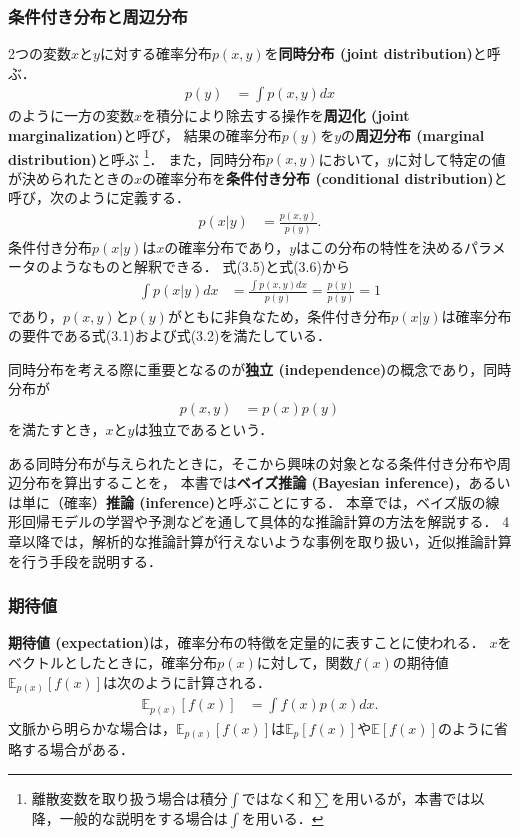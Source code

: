 \documentclass[11pt,a4paper]{jsarticle}
\numberwithin{equation}{section}
\begin{document}
\subsubsection{条件付き分布と周辺分布}
2つの変数$x$と$y$に対する確率分布$p(x, y)$を\textbf{同時分布 (joint distribution)}と呼ぶ．
\begin{align}
p(y)
& =
\int p(x, y) dx
\end{align}
のように一方の変数$x$を積分により除去する操作を\textbf{周辺化 (joint marginalization)}と呼び，
結果の確率分布$p(y)$を$y$の\textbf{周辺分布 (marginal distribution)}と呼ぶ
\footnote{
離散変数を取り扱う場合は積分$\int$ではなく和$\sum$を用いるが，本書では以降，一般的な説明をする場合は$\int$を用いる．
}．
また，同時分布$p(x, y)$において，$y$に対して特定の値が決められたときの$x$の確率分布を\textbf{条件付き分布 (conditional distribution)}と呼び，次のように定義する．
\begin{align}
p(x | y)
& =
\frac{p(x, y)}{p(y)}.
\end{align}
条件付き分布$p(x | y)$は$x$の確率分布であり，$y$はこの分布の特性を決めるパラメータのようなものと解釈できる．
式(3.5)と式(3.6)から
\begin{align}
\int p(x | y) dx
& =
\frac{\int p(x, y) dx}{p(y)}
= \frac{p(y)}{p(y)}
= 1
\end{align}
であり，$p(x, y)$と$p(y)$がともに非負なため，条件付き分布$p(x | y)$は確率分布の要件である式(3.1)および式(3.2)を満たしている．

同時分布を考える際に重要となるのが\textbf{独立 (independence)}の概念であり，同時分布が
\begin{align}
p(x, y)
& =
p(x) p(y)
\end{align}
を満たすとき，$x$と$y$は独立であるという．

ある同時分布が与えられたときに，そこから興味の対象となる条件付き分布や周辺分布を算出することを，
本書では\textbf{ベイズ推論 (Bayesian inference)}，あるいは単に（確率）\textbf{推論 (inference)}と呼ぶことにする．
本章では，ベイズ版の線形回帰モデルの学習や予測などを通して具体的な推論計算の方法を解説する．
4章以降では，解析的な推論計算が行えないような事例を取り扱い，近似推論計算を行う手段を説明する．

\subsubsection{期待値}
\textbf{期待値 (expectation)}は，確率分布の特徴を定量的に表すことに使われる．
$x$をベクトルとしたときに，確率分布$p(x)$に対して，関数$f(x)$の期待値$\mathbb{E}_{p(x)} [f(x)]$は次のように計算される．
\begin{align}
\mathbb{E}_{p(x)} [f(x)]
& =
\int f(x) p(x) dx.
\end{align}
文脈から明らかな場合は，$\mathbb{E}_{p(x)} [f(x)]$は$\mathbb{E}_{p} [f(x)]$や$\mathbb{E} [f(x)]$のように省略する場合がある．
\end{document}

